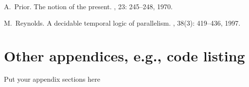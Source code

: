 \documentclass{report}
\begin{document}
\appendix

\begin{thebibliography}{HHM99} %

A.~Prior.
\newblock The notion of the present.
, 23:  245--248, 1970.

M.~Reynolds.
\newblock A decidable temporal logic of parallelism.
, 38(3):  419--436,
  1997.

\end{thebibliography}

\chapter{Other appendices, e.g., code listing} %
Put your appendix sections here %
\end{document}
